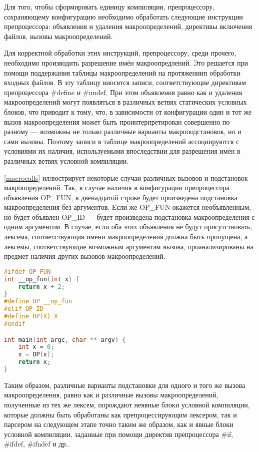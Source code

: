 Для того, чтобы сформировать единицу компиляции, препроцессору, сохраняющему конфигурацию необходимо обработать следующие инструкции препроцессора: объявления и удаления макроопределений, директивы включения файлов, вызовы макроопределений.

Для корректной обработки этих инструкций, препроцессору, среди прочего, необходимо производить разрешение имён макроопредлений. Это решается при помощи поддержания таблицы макроопределений на протяжениип обработки входных файлов. В эту таблицу вносятся записи, соответствующие директивам препроцессора \#define и \#undef. При этом объявления равно как и удаления макроопределений могут появляться в различных ветвях статических условных блоков, что приводит к тому, что, в зависимости от конфигурации один и тот же вызов макроопределения может быть проинтерпретирован совершенно по-разному --- возможны не только различные варианты макроподстановок, но и сами вызовы. Поэтому записи в таблице макроопределений ассоциируются с условиями их наличия, используемыми впоследствии для разрешения имён в различных ветвях условной компиляции.

\autoref{macrocalls} иллюстрирует некоторые случаи различных вызовов и подстановок макроопределений. Так, в случае наличия в конфигурации препроцессора объявления OP\_FUN, в двенадцатой строке будет произведена подстановка макроопределения без аргументов. Eсли же OP\_FUN окажется необъявленным, но будет объявлен OP\_ID --- будет произведена подстановка макроопределения с одним аргументом. В случае, если оба этих объявления не будут присутствовать, лексема, соответствующая имени макроопределения должна быть пропущена, а лексемы, соответствующие возможным аргументам вызова, проанализированы на предмет наличия других вызовов макроопределений.

\begin{minipage}{\linewidth}
\begin{lstlisting}[caption={Различные вызовы макроопределения при различных конфигурациях препроцессора},language=C,label=macrocalls]
#ifdef OP_FUN
int __op_fun(int x) {
	return x + 2;
}
#define OP __op_fun
#elif OP_ID
#define OP(X) X
#endif

int main(int argc, char ** argv) {
	int x = 0;
	x = OP(x);
	return x;	
}
\end{lstlisting}
\end{minipage}

Таким образом, различные варианты подстановки для одного и того же вызова макроопределения, равно как и различные вызовы макроопределений, полученные из тех же лексем, порождают неявные блоки условной компиляции, которые должны быть обработаны как препроцессирующим лексером, так и парсером на следующем этапе точно таким же образом, как и явные блоки условной компиляции, заданные при помощи директив препроцессора \#if, \#ifdef, \#ifndef и др..


